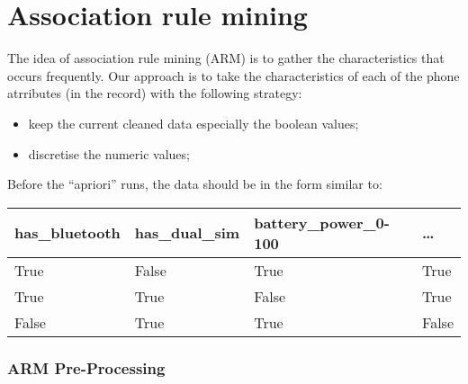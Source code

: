 \documentclass[11pt]{article}
\providecommand{\tightlist}{%
      \setlength{\itemsep}{0pt}\setlength{\parskip}{0pt}}
\begin{document}
    

    \hypertarget{association-rule-mining}{%
\section{Association rule mining}\label{association-rule-mining}}

The idea of association rule mining (ARM) is to gather the
characteristics that occurs frequently. Our approach is to take the
characteristics of each of the phone atrributes (in the record) with the
following strategy:

\begin{itemize}
\tightlist
\item
  keep the current cleaned data especially the boolean values;
\item
  discretise the numeric values;
\end{itemize}

Before the ``apriori'' runs, the data should be in the form similar to:

\begin{longtable}[]{@{}llll@{}}
\toprule
has\_bluetooth & has\_dual\_sim & battery\_power\_0-100 &
\ldots{}\tabularnewline
\midrule
\endhead
True & False & True & True\tabularnewline
True & True & False & True\tabularnewline
False & True & True & False\tabularnewline
\bottomrule
\end{longtable}

    \hypertarget{arm-pre-processing}{%
\subsubsection{ARM Pre-Processing}\label{arm-pre-processing}}
\end{document}
